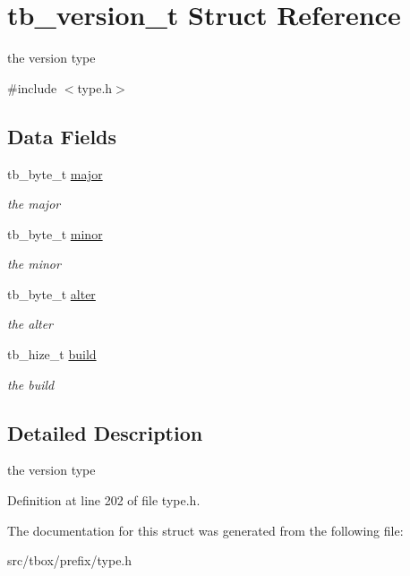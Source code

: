 \hypertarget{structtb__version__t}{\section{tb\-\_\-version\-\_\-t Struct Reference}
\label{structtb__version__t}
}


the version type  




{\ttfamily \#include $<$type.\-h$>$}

\subsection*{Data Fields}
\begin{DoxyCompactItemize}
\item 
\hypertarget{structtb__version__t_a3728d5149beee7ed68e132c45f09f231}{tb\-\_\-byte\-\_\-t \hyperlink{structtb__version__t_a3728d5149beee7ed68e132c45f09f231}{major}}\label{structtb__version__t_a3728d5149beee7ed68e132c45f09f231}

\begin{DoxyCompactList}\small\item\em the major \end{DoxyCompactList}\item 
\hypertarget{structtb__version__t_a914c51e6951b5f621c072ada9d8e0143}{tb\-\_\-byte\-\_\-t \hyperlink{structtb__version__t_a914c51e6951b5f621c072ada9d8e0143}{minor}}\label{structtb__version__t_a914c51e6951b5f621c072ada9d8e0143}

\begin{DoxyCompactList}\small\item\em the minor \end{DoxyCompactList}\item 
\hypertarget{structtb__version__t_a505d03eca96b98c722be4832acf9b458}{tb\-\_\-byte\-\_\-t \hyperlink{structtb__version__t_a505d03eca96b98c722be4832acf9b458}{alter}}\label{structtb__version__t_a505d03eca96b98c722be4832acf9b458}

\begin{DoxyCompactList}\small\item\em the alter \end{DoxyCompactList}\item 
\hypertarget{structtb__version__t_ae166faabd5a7a58ffcea9a708a76bc06}{tb\-\_\-hize\-\_\-t \hyperlink{structtb__version__t_ae166faabd5a7a58ffcea9a708a76bc06}{build}}\label{structtb__version__t_ae166faabd5a7a58ffcea9a708a76bc06}

\begin{DoxyCompactList}\small\item\em the build \end{DoxyCompactList}\end{DoxyCompactItemize}


\subsection{Detailed Description}
the version type 

Definition at line 202 of file type.\-h.



The documentation for this struct was generated from the following file\-:\begin{DoxyCompactItemize}
\item 
src/tbox/prefix/type.\-h\end{DoxyCompactItemize}
